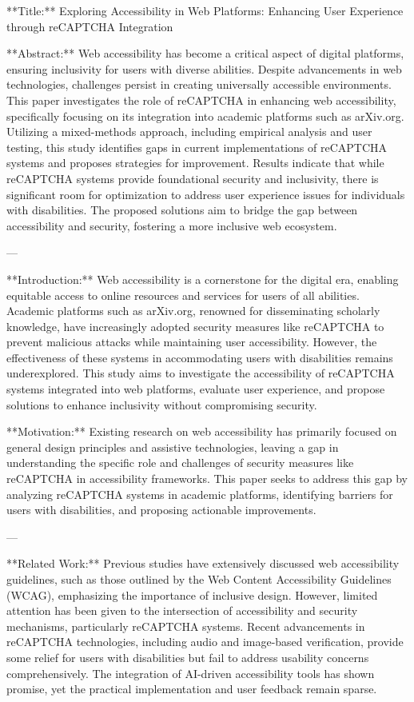 **Title:**  
Exploring Accessibility in Web Platforms: Enhancing User Experience through reCAPTCHA Integration

**Abstract:**  
Web accessibility has become a critical aspect of digital platforms, ensuring inclusivity for users with diverse abilities. Despite advancements in web technologies, challenges persist in creating universally accessible environments. This paper investigates the role of reCAPTCHA in enhancing web accessibility, specifically focusing on its integration into academic platforms such as arXiv.org. Utilizing a mixed-methods approach, including empirical analysis and user testing, this study identifies gaps in current implementations of reCAPTCHA systems and proposes strategies for improvement. Results indicate that while reCAPTCHA systems provide foundational security and inclusivity, there is significant room for optimization to address user experience issues for individuals with disabilities. The proposed solutions aim to bridge the gap between accessibility and security, fostering a more inclusive web ecosystem.

---

**Introduction:**  
Web accessibility is a cornerstone for the digital era, enabling equitable access to online resources and services for users of all abilities. Academic platforms such as arXiv.org, renowned for disseminating scholarly knowledge, have increasingly adopted security measures like reCAPTCHA to prevent malicious attacks while maintaining user accessibility. However, the effectiveness of these systems in accommodating users with disabilities remains underexplored. This study aims to investigate the accessibility of reCAPTCHA systems integrated into web platforms, evaluate user experience, and propose solutions to enhance inclusivity without compromising security.

**Motivation:**  
Existing research on web accessibility has primarily focused on general design principles and assistive technologies, leaving a gap in understanding the specific role and challenges of security measures like reCAPTCHA in accessibility frameworks. This paper seeks to address this gap by analyzing reCAPTCHA systems in academic platforms, identifying barriers for users with disabilities, and proposing actionable improvements.

---

**Related Work:**  
Previous studies have extensively discussed web accessibility guidelines, such as those outlined by the Web Content Accessibility Guidelines (WCAG), emphasizing the importance of inclusive design. However, limited attention has been given to the intersection of accessibility and security mechanisms, particularly reCAPTCHA systems. Recent advancements in reCAPTCHA technologies, including audio and image-based verification, provide some relief for users with disabilities but fail to address usability concerns comprehensively. The integration of AI-driven accessibility tools has shown promise, yet the practical implementation and user feedback remain sparse.

